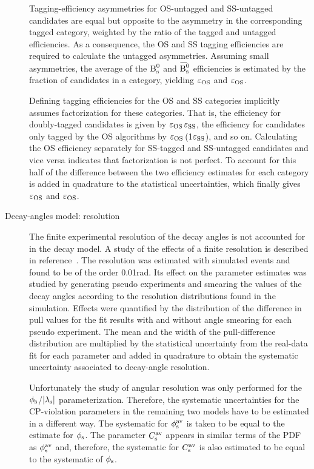 \begin{description}
Tagging-efficiency asymmetries for OS-untagged and SS-untagged candidates are equal but opposite to the asymmetry in the corresponding
tagged category, weighted by the ratio of the tagged and untagged efficiencies. As a consequence, the OS and SS tagging efficiencies are
required to calculate the untagged asymmetries. Assuming small asymmetries, the average of the $\Bs$ and $\Bsbar$ efficiencies is estimated
by the fraction of candidates in a category, yielding $\tagCatCoef[\text{OS}]$ and
$\tagCatCoef[\text{OS}]$.

Defining tagging efficiencies for the OS and SS categories implicitly assumes factorization for these categories.  That is, the efficiency
for doubly-tagged candidates is given by $\tagCatCoef[\text{OS}]\,\tagCatCoef[\text{SS}]$, the efficiency for candidates only tagged by the
OS algorithms by $\tagCatCoef[\text{OS}]$\,(1\textminus$\tagCatCoef[\text{SS}]$), and so on. Calculating the OS efficiency separately for
SS-tagged and SS-untagged candidates and vice versa indicates that factorization is not perfect. To account for this half of the difference
between the two efficiency estimates for each category is added in quadrature to the statistical uncertainties, which finally gives
$\tagCatCoef[\text{OS}]$ and $\tagCatCoef[\text{OS}]$.

\item[Decay-angles model: resolution]
The finite experimental resolution of the decay angles is not accounted for in the decay model. A study of the effects of a finite
resolution is described in reference~\cite{LHCb-ANA-2014-039}. The resolution was estimated with simulated events and found to be of the
order 0.01\unitsp{}rad. Its effect on the parameter estimates was studied by generating pseudo experiments and smearing the values of the
decay angles according to the resolution distributions found in the simulation. Effects were quantified by the distribution of the
difference in pull values for the fit results with and without angle smearing for each pseudo experiment. The mean and the width of the
pull-difference distribution are multiplied by the statistical uncertainty from the real-data fit for each parameter and added in
quadrature to obtain the systematic uncertainty associated to decay-angle resolution.

Unfortunately the study of angular resolution was only performed for the $\phis$/$\lamsAbs$ parameterization. Therefore, the systematic
uncertainties for the CP-violation parameters in the remaining two models have to be estimated in a different way. The systematic
for $\phisav$ is taken to be equal to the estimate for $\phis$. The parameter $\Csav$ appears in similar terms of the PDF as $\phisav$ and,
therefore, the systematic for $\Csav$ is also estimated to be equal to the systematic of $\phis$.


\end{description}
